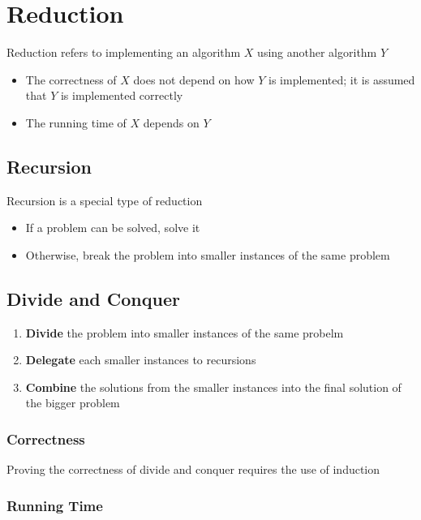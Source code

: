 \chapter{Reduction}

Reduction refers to implementing an algorithm $ X $ using another algorithm
$ Y $

\begin{itemize}
  \item The correctness of $ X $ does not depend on how $ Y $ is implemented;
  it is assumed that $ Y $ is implemented correctly
  \item The running time of $ X $ depends on $ Y $
\end{itemize}

\section{Recursion}

  Recursion is a special type of reduction

  \begin{itemize}
    \item If a problem can be solved, solve it
    \item Otherwise, break the problem into smaller instances of the same
    problem
  \end{itemize}

\section{Divide and Conquer}

  \begin{enumerate}
    \item \textbf{Divide} the problem into smaller instances of the same
    probelm
    \item \textbf{Delegate} each smaller instances to recursions
    \item \textbf{Combine} the solutions from the smaller instances into
    the final solution of the bigger problem
  \end{enumerate}

  \subsection{Correctness}

    Proving the correctness of divide and conquer requires the use of induction

  \subsection{Running Time}

